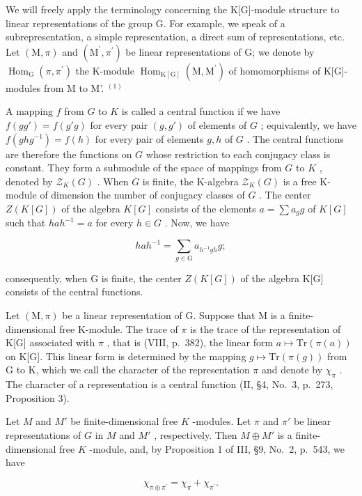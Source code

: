 We will freely apply the terminology concerning the K{[}G{]}-module structure to linear representations of the group G. For example, we speak of a subrepresentation, a simple representation, a direct sum of representations, etc. Let \((\mathrm{M},\pi)\) and \((\mathrm{M}^{\prime},\pi^{\prime})\) be linear representations of G; we denote by \(\operatorname{Hom}_{\mathrm{G}}(\pi,\pi^{\prime})\) the K-module \(\operatorname{Hom}_{\mathrm{K[G]}}(\mathrm{M},\mathrm{M}^{\prime})\) of homomorphisms of K{[}G{]}-modules from M to M'. \(^{(1)}\)

A mapping \(f\) from \(G\) to \(K\) is called a central function if we have \(f(gg') = f(g'g)\) for every pair \((g, g')\) of elements of \(G\) ; equivalently, we have \(f(ghg^{-1}) = f(h)\) for every pair of elements \(g, h\) of \(G\) . The central functions are therefore the functions on \(G\) whose restriction to each conjugacy class is constant. They form a submodule of the space of mappings from \(G\) to \(K\) , denoted by \(\mathcal{Z}_K(G)\) . When \(G\) is finite, the K-algebra \(\mathcal{Z}_K(G)\) is a free K-module of dimension the number of conjugacy classes of \(G\) . The center \(Z(K[G])\) of the algebra \(K[G]\) consists of the elements \(a = \sum a_g g\) of \(K[G]\) such that \(hah^{-1} = a\) for every \(h \in G\) . Now, we have

\[
h a h ^ {- 1} = \sum_ {g \in \mathrm{G}} a _ {h ^ {- 1} g h} g;
\]

consequently, when G is finite, the center \(Z(K[G])\) of the algebra K{[}G{]} consists of the central functions.

Let \((\mathrm{M},\pi)\) be a linear representation of G. Suppose that M is a finite-dimensional free K-module. The trace of \(\pi\) is the trace of the representation of K{[}G{]} associated with \(\pi\) , that is (VIII, p.~382), the linear form \(a\mapsto\mathrm{Tr}(\pi(a))\) on K{[}G{]}. This linear form is determined by the mapping \(g\mapsto\mathrm{Tr}(\pi(g))\) from G to K, which we call the character of the representation \(\pi\) and denote by \(\chi_{\pi}\) . The character of a representation is a central function (II, §4, No.~3, p.~273, Proposition 3).

Let \(M\) and \(M'\) be finite-dimensional free \(K\) -modules. Let \(\pi\) and \(\pi'\) be linear representations of \(G\) in \(M\) and \(M'\) , respectively. Then \(M \oplus M'\) is a finite-dimensional free \(K\) -module, and, by Proposition 1 of III, §9, No.~2, p.~543, we have

\[
\chi_ {\pi \oplus \pi^ {\prime}} = \chi_ {\pi} + \chi_ {\pi^ {\prime}}.
\]

